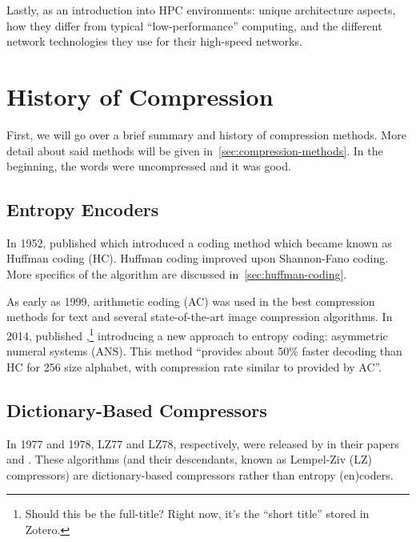Lastly, as an introduction into HPC environments: unique architecture aspects,
how they differ from typical ``low-performance'' computing, and the different
network technologies they use for their high-speed networks.

\section{History of Compression}
\label{sec:compression-history}
First, we will go over a brief summary and history of compression methods. More
detail about said methods will be given in~\cref{sec:compression-methods}. In
the beginning, the words were uncompressed and it was good.

\subsection{Entropy Encoders}
\label{subsec:entropy-compressor-history}
In 1952, \citeauthor{huffman_method_1952} published
 which introduced a coding method which became
known as Huffman coding (HC). Huffman coding improved upon Shannon-Fano coding.
More specifics of the algorithm are discussed in~\cref{sec:huffman-coding}.

As early as 1999, arithmetic coding (AC) was used in the best compression
methods for text and several state-of-the-art image compression
algorithms\cite[110]{mackay_information_2003}. In 2014,
\citeauthor{duda_asymmetric_2013}
published ,\footnote{Should this be the
  full-title? Right now, it's the ``short title'' stored in Zotero.} introducing
a new approach to entropy coding: asymmetric numeral systems (ANS). This method
``provides about 50\% faster decoding than HC for 256 size alphabet, with
compression rate similar to provided by AC''\cite{duda_asymmetric_2013}.

\subsection{Dictionary-Based Compressors}
\label{subsec:dict-compressor-history}
In 1977 and 1978, LZ77 and LZ78, respectively, were released by
\citeauthor{ziv_universal_1977} in their papers
\cite{ziv_universal_1977} and
\cite{ziv_compression_1978}. These algorithms
(and their descendants, known as Lempel-Ziv (LZ) compressors) are
dictionary-based compressors rather than entropy (en)coders.

